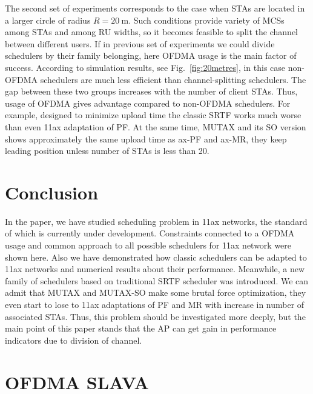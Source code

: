 The second set of experiments corresponds to the case when STAs are located in a larger circle of radius $R = \SI{20}{\m}$.
Such conditions provide variety of MCSs among STAs and among RU widths, so it becomes feasible to split the channel between different users. 
If in previous set of experiments we could divide schedulers by their family belonging, here OFDMA usage is the main factor of success.
According to simulation results, see Fig.~\ref{fig:20metres}, in this case non-OFDMA schedulers are  much less efficient than channel-splitting schedulers. 
The gap between these two groups increases with the number of client STAs. 
Thus, usage of OFDMA gives advantage compared to non-OFDMA schedulers. 
For example, designed to minimize upload time the classic SRTF works much worse than even 11ax adaptation of PF. 
At the same time, MUTAX and its SO version shows approximately the same upload time as ax-PF and ax-MR, they keep leading position unless number of STAs is less than 20.  

\section{Conclusion}
\label{sec:conclusion}

In the paper, we have studied scheduling problem in 11ax networks, the standard of which is currently under development. Constraints connected to a OFDMA usage and common approach to all possible schedulers for 11ax network were shown here. 
Also we have demonstrated how classic schedulers can be adapted to 11ax networks and numerical results about their performance. 
Meanwhile, a new family of schedulers based on traditional SRTF scheduler was introduced. 
We can admit that MUTAX and MUTAX-SO make some brutal force optimization, they even start to lose to 11ax adaptations of PF and MR with increase in number of associated STAs. 
Thus, this problem should be investigated more deeply, but the main point of this paper stands that the AP can get gain in performance indicators due to division of channel.

\iffalse
\clearpage

\section{OFDMA SLAVA}

